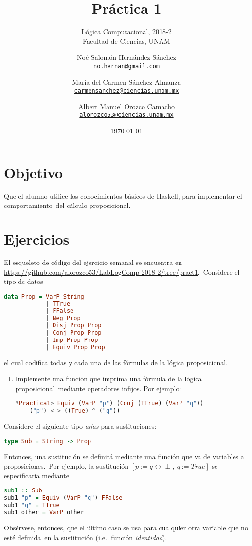 \documentclass[paper=letter, fontsize=12pt]{scrartcl}
\title{Práctica 1}
\subtitle{
  Lógica Computacional, 2018-2\\
  Facultad de Ciencias, UNAM
}
\author{
  \normalsize
  Noé Salomón Hernández Sánchez\\
  \normalsize
  \texttt{\href{mailto:no.hernan@gmail.com}{no.hernan@gmail.com}}
  \and
  \normalsize
  María del Carmen Sánchez Almanza\\
  \normalsize
  \texttt{\href{mailto:carmensanchez@ciencias.unam.mx}{carmensanchez@ciencias.unam.mx}}
  \and
  \normalsize
  Albert Manuel Orozco Camacho\\
  \normalsize
  \texttt{\href{mailto:alorozco53@ciencias.unam.mx}{alorozco53@ciencias.unam.mx}}
}
\date{\today}
\begin{document}
\maketitle

\section{Objetivo}

\noindent
Que el alumno utilice los conocimientos básicos de Haskell, para implementar el comportamiento\
del cálculo proposicional.

\section{Ejercicios}

\noindent
El esqueleto de código del ejercicio semanal se encuentra en \url{https://github.com/alorozco53/LabLogComp-2018-2/tree/pract1}.\
Considere el tipo de datos
\begin{lstlisting}[language=Haskell]
  data Prop = VarP String
            | TTrue
            | FFalse
            | Neg Prop
            | Disj Prop Prop
            | Conj Prop Prop
            | Imp Prop Prop
            | Equiv Prop Prop
\end{lstlisting}
el cual codifica todas y cada una de las fórmulas de la lógica proposicional.

\begin{enumerate}
\item Implemente una función que imprima una fórmula de la lógica proposicional\
  mediante operadores infijos. Por ejemplo:
    \begin{lstlisting}[language=Haskell]
    *Practica1> Equiv (VarP "p") (Conj (TTrue) (VarP "q"))
    ("p") <-> ((True) ^ ("q"))
    \end{lstlisting}
\end{enumerate}

\noindent
Considere el siguiente tipo \textit{alias} para sustituciones:
\begin{lstlisting}[language=Haskell]
  type Sub = String -> Prop
\end{lstlisting}
Entonces, una sustitución se definirá mediante una función que va de variables a proposiciones.\
Por ejemplo, la sustitución $[p := q \leftrightarrow \perp,\ q := True]$ se especificaría mediante
\begin{lstlisting}[language=Haskell]
sub1 :: Sub
sub1 "p" = Equiv (VarP "q") FFalse
sub1 "q" = TTrue
sub1 other = VarP other
\end{lstlisting}
Obsérvese, entonces, que el último caso se usa para cualquier otra variable que no esté definida\
en la sustitución (i.e., función \emph{identidad}).
\end{document}
